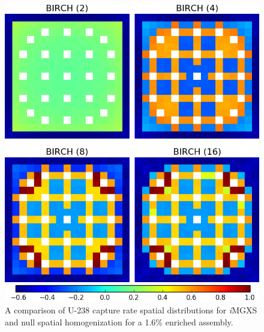 \begin{figure}[h!]
\centering
\includegraphics[width=0.9\linewidth]{figures/results/compare/assm-16/compare-capt}
\vspace{2mm}
\caption[U-238 capture rate comparison for a 1.6\% enriched assembly]{A comparison of U-238 capture rate spatial distributions for \textit{i}\ac{MGXS} and null spatial homogenization for a 1.6\% enriched assembly.}
\label{fig:chap11-assm-1.6-capt-rates-comp}
\end{figure}

\clearpage

